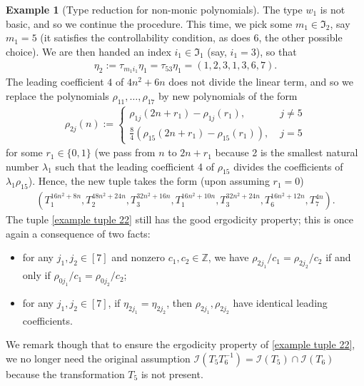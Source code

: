 \documentclass[11pt]{amsart}
\theoremstyle{definition}
\newtheorem{example}{Example}
\newcommand{\Z}{{\mathbb Z}}
\newcommand{\CI}{{\mathcal I}}
\newcommand{\FI}{{\mathfrak I}}
\begin{document}
\begin{example}[Type reduction for non-monic polynomials]
The type $w_1$ is not basic, and so we continue the procedure. This time, we pick some $m_1\in\FI_2$, say $m_1 = 5$ (it satisfies the controllability condition, as does 6, the other possible choice). We are then handed an index $i_1\in\FI_1$ (say, $i_1 = 3$), so that
\begin{align*}
    \eta_2 := \tau_{m_1 i_1}\eta_1= \tau_{53}\eta_1 = (1, 2, 3, 1, 3, 6, 7).
\end{align*}
The leading coefficient $4$ of $4n^2+6n$ does not divide the linear term, and so we replace the polynomials $\rho_{11}, \ldots, \rho_{17}$ by new polynomials of the form
\begin{align*}
    \rho_{2j}(n) := \begin{cases} \rho_{1j}(2 n + r_1) - \rho_{1j}(r_1),\; &j \neq 5\\
    \frac{8}{4}(\rho_{15}(2 n + r_1) - \rho_{15}(r_1)),\; &j =5
    \end{cases}
\end{align*}
for some $r_1\in\{0,1\}$ (we pass from $n$ to $2n+r_1$ because 2 is the smallest natural number $\lambda_1$ such that the leading coefficient 4 of $\rho_{15}$ divides the coefficients of $\lambda_1 \rho_{15}$). Hence, the new tuple takes the form (upon assuming $r_1 = 0$)
\begin{align}\label{example tuple 22}
    (T_1^{16n^2 + 8n}, T_2^{48n^2+24n}, T_3^{32n^2+16n}, T_1^{16n^2+10n}, T_3^{32n^2+24n}, T_6^{16n^2+12n}, T_7^{4n}).
\end{align}
The tuple \eqref{example tuple 22} still has the good ergodicity property; this is once again a consequence of two facts:
\begin{itemize}
    \item for any $j_1, j_2\in[7]$ and nonzero $c_1, c_2\in\Z$, we have $\rho_{2j_1}/c_1 = \rho_{2j_2}/c_2$ if and only if $\rho_{0j_1}/c_1 = \rho_{0j_2}/c_2$;
    \item for any $j_1, j_2\in[7]$, if $\eta_{2j_1} = \eta_{2j_2}$, then $\rho_{2j_1}, \rho_{2j_2}$ have identical leading coefficients.
\end{itemize}
We remark though that to ensure the ergodicity property of \eqref{example tuple 22}, we no longer need the original assumption $\CI(T_5 T_6^{-1}) = \CI(T_5)\cap\CI(T_6)$ because the transformation $T_5$ is not present.


\end{example}
\end{document}
